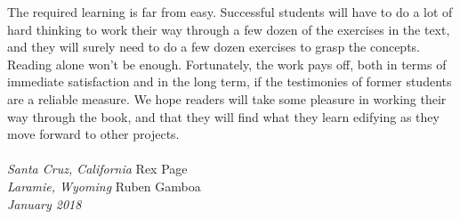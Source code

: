 The required learning is far from easy. 
Successful students will have to do a lot of hard thinking 
to work their way through a few dozen of the exercises in the text, 
and they will surely need to do a few dozen exercises to grasp the concepts. 
Reading alone won't be enough.
Fortunately, the work pays off, both in terms of immediate satisfaction
and in the long term, if the testimonies of former students are a
reliable measure.
We hope readers will take some pleasure in working their way through
the book, and that they will find what they learn 
edifying as they move forward to other projects.
\\
\\
\emph{Santa Cruz, California}   \hfill Rex Page \\
\emph{Laramie, Wyoming}         \hfill Ruben Gamboa \\
\emph{January 2018}


